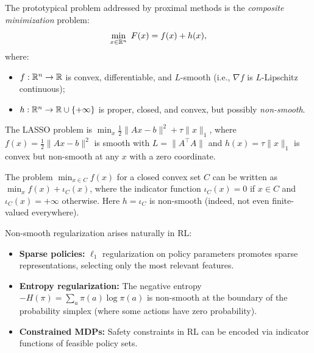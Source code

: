 \documentclass[11pt,a4paper]{article}
\begin{document}
The prototypical problem addressed by proximal methods is the
\emph{composite minimization} problem:
\begin{equation}\label{eq:composite}
  \min_{x \in \mathbb{R}^n}\; F(x) = f(x) + h(x),
\end{equation}
where:
\begin{itemize}
  \item $f : \mathbb{R}^n \to \mathbb{R}$ is convex, differentiable, and $L$-smooth
    (i.e., $\nabla f$ is $L$-Lipschitz continuous);
  \item $h : \mathbb{R}^n \to \mathbb{R} \cup \{+\infty\}$ is proper, closed, and
    convex, but possibly \emph{non-smooth}.
\end{itemize}

\begin{example}%
\label{ex:lasso}
The LASSO problem is
$\min_x \frac{1}{2}\|Ax - b\|^2 + \tau\|x\|_1$,
where $f(x) = \frac{1}{2}\|Ax - b\|^2$ is smooth with $L = \|A^\top A\|$
and $h(x) = \tau\|x\|_1$ is convex but non-smooth at any $x$ with a
zero coordinate.
\end{example}

\begin{example}\label{ex:constrained}
The problem $\min_{x \in C} f(x)$ for a closed convex set $C$ can be
written as $\min_x f(x) + \iota_C(x)$, where the indicator function
$\iota_C(x) = 0$ if $x \in C$ and $\iota_C(x) = +\infty$ otherwise.
Here $h = \iota_C$ is non-smooth (indeed, not even finite-valued
everywhere).
\end{example}

\begin{rlconnection}[title={Non-Smooth Optimization in RL}]
Non-smooth regularization arises naturally in RL:
\begin{itemize}
  \item \textbf{Sparse policies:} $\ell_1$ regularization on policy
    parameters promotes sparse representations, selecting only the
    most relevant features.
  \item \textbf{Entropy regularization:} The negative entropy
    $-H(\pi) = \sum_a \pi(a)\log\pi(a)$ is non-smooth at the boundary
    of the probability simplex (where some actions have zero probability).
  \item \textbf{Constrained MDPs:} Safety constraints in RL can be
    encoded via indicator functions of feasible policy sets.
\end{itemize}
\end{rlconnection}
\end{document}
